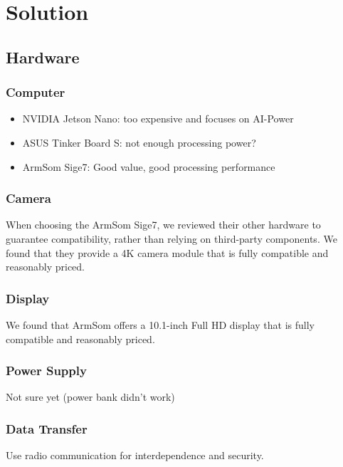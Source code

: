 \chapter{Solution}

\section{Hardware}

\subsection{Computer}

\begin{itemize}
	\item NVIDIA Jetson Nano: too expensive and focuses on AI-Power
	\item ASUS Tinker Board S: not enough processing power?
	\item ArmSom Sige7: Good value, good processing performance
\end{itemize}


\subsection{Camera}

When choosing the ArmSom Sige7, we reviewed their other hardware to guarantee compatibility, rather than relying on third-party components. We found that they provide a 4K camera module that is fully compatible and reasonably priced.

\subsection{Display}

We found that ArmSom offers a 10.1-inch Full HD display that is fully compatible and reasonably priced.

\subsection{Power Supply}

Not sure yet (power bank didn't work)

\subsection{Data Transfer}

Use radio communication for interdependence and security. 


